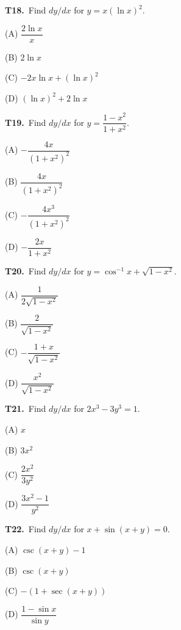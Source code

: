 \documentclass[11pt]{article}
\begin{document}
\bigskip\noindent\textbf{T18.}\ Find $dy/dx$ for $y = x(\ln x)^2$.
\begin{list}{}{\setlength{\leftmargin}{3em}\setlength{\labelwidth}{2.5em}\setlength{\itemsep}{0pt}\setlength{\topsep}{2pt}}
\item[(A)] $\dfrac{2\ln x}{x}$
\item[(B)] $2\ln x$
\item[(C)] $-2x\ln x + (\ln x)^2$
\item[(D)] $(\ln x)^2 + 2\ln x$
\end{list}

\bigskip\noindent\textbf{T19.}\ Find $dy/dx$ for $y = \dfrac{1-x^2}{1+x^2}$.
\begin{list}{}{\setlength{\leftmargin}{3em}\setlength{\labelwidth}{2.5em}\setlength{\itemsep}{0pt}\setlength{\topsep}{2pt}}
\item[(A)] $-\dfrac{4x}{(1+x^2)^2}$
\item[(B)] $\dfrac{4x}{(1+x^2)^2}$
\item[(C)] $-\dfrac{4x^3}{(1+x^2)^2}$
\item[(D)] $-\dfrac{2x}{1+x^2}$
\end{list}

\bigskip\noindent\textbf{T20.}\ Find $dy/dx$ for $y = \cos^{-1}x + \sqrt{1-x^2}$.
\begin{list}{}{\setlength{\leftmargin}{3em}\setlength{\labelwidth}{2.5em}\setlength{\itemsep}{0pt}\setlength{\topsep}{2pt}}
\item[(A)] $\dfrac{1}{2\sqrt{1-x^2}}$
\item[(B)] $\dfrac{2}{\sqrt{1-x^2}}$
\item[(C)] $-\dfrac{1+x}{\sqrt{1-x^2}}$
\item[(D)] $\dfrac{x^2}{\sqrt{1-x^2}}$
\end{list}

\bigskip\noindent\textbf{T21.}\ Find $dy/dx$ for $2x^3 - 3y^3 = 1$.
\begin{list}{}{\setlength{\leftmargin}{3em}\setlength{\labelwidth}{2.5em}\setlength{\itemsep}{0pt}\setlength{\topsep}{2pt}}
\item[(A)] $x$
\item[(B)] $3x^2$
\item[(C)] $\dfrac{2x^2}{3y^2}$
\item[(D)] $\dfrac{3x^2-1}{y^2}$
\end{list}

\bigskip\noindent\textbf{T22.}\ Find $dy/dx$ for $x + \sin(x+y) = 0$.
\begin{list}{}{\setlength{\leftmargin}{3em}\setlength{\labelwidth}{2.5em}\setlength{\itemsep}{0pt}\setlength{\topsep}{2pt}}
\item[(A)] $\csc(x+y) - 1$
\item[(B)] $\csc(x+y)$
\item[(C)] $-(1+\sec(x+y))$
\item[(D)] $\dfrac{1-\sin x}{\sin y}$
\end{list}
\end{document}
